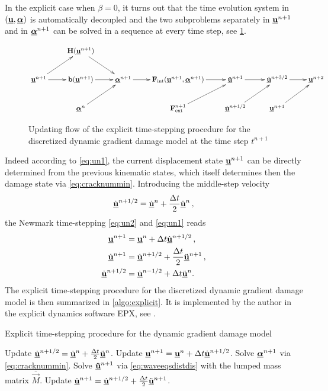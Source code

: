 In the explicit case when $\beta=0$, it turns out that the time evolution system in $(\uvec,\dvec)$ is automatically decoupled and the two subproblems separately in $\uvec^{n+1}$ and in $\dvec^{n+1}$ can be solved in a sequence at every time step, see \cref{fig:updatestate}.
\begin{figure}[htbp]
\centering
\[
\xymatrix{ & \vec{H}(\uvec^{n+1}) \ar[dr] & & & & & \\
\uvec^{n+1} \ar[ur] \ar[r] & \vec{b}(\uvec^{n+1}) \ar[r] & \dvec^{n+1} \ar[r] & \vec{F}_\mathrm{int}(\uvec^{n+1},\dvec^{n+1}) \ar[r] & \ddot{\uvec}^{n+1} \ar[r] & \dot{\uvec}^{n+3/2} \ar[r] & \uvec^{n+2} \\
& \dvec^n \ar[ur] & & \vec{F}_\mathrm{ext}^{n+1} \ar[ur] & \dot{\uvec}^{n+1/2} \ar[ur] & \uvec^{n+1} \ar[ur] &}
\]
\caption{Updating flow of the explicit time-stepping procedure for the discretized dynamic gradient damage model at the time step $t^{n+1}$}
\label{fig:updatestate}
\end{figure}
Indeed according to \eqref{eq:un1}, the current displacement state $\uvec^{n+1}$ can be directly determined from the previous kinematic states, which itself determines then the damage state via \eqref{eq:cracknummin}. Introducing the middle-step velocity
\[
\dot{\uvec}^{n+1/2}=\dot{\uvec}^n+\frac{\Delta t}{2}\ddot{\uvec}^n\,,
\]
the Newmark time-stepping \eqref{eq:un2} and \eqref{eq:un1} reads
\begin{align*}
\uvec^{n+1} &= \uvec^n+\Delta t\dot{\uvec}^{n+1/2}\,, \\
\dot{\uvec}^{n+1} &= \dot{\uvec}^{n+1/2}+\frac{\Delta t}{2}\ddot{\uvec}^{n+1}\,, \\
\dot{\uvec}^{n+1/2} &= \dot{\uvec}^{n-1/2}+\Delta t\ddot{\uvec}^{n}.
\end{align*}
The explicit time-stepping procedure for the discretized dynamic gradient damage model is then summarized in \cref{algo:explicit}. It is implemented by the author in the explicit dynamics software EPX, see \cite{EPX:2015}.
\begin{algorithm}[htbp]
\caption{Explicit time-stepping procedure for the dynamic gradient damage model} \label{algo:explicit}
\begin{algorithmic}[1]\linespread{1.2}\selectfont\normalsize
{}
  \State Update $\dot{\uvec}^{n+1/2}=\dot{\uvec}^{n}+\frac{\Delta t}{2}\ddot{\uvec}^n$.
  \State Update $\uvec^{n+1}=\uvec^n+\Delta t\dot{\uvec}^{n+1/2}$.
  \State Solve $\dvec^{n+1}$ via \eqref{eq:cracknummin}.
  \State Solve $\ddot{\uvec}^{n+1}$ via \eqref{eq:waveeqsdistdis} with the lumped mass matrix $\overline{\vec{M}}$.
  \State Update $\dot{\uvec}^{n+1}=\dot{\uvec}^{n+1/2}+\frac{\Delta t}{2}\ddot{\uvec}^{n+1}$.
\EndFor
\end{algorithmic}
\end{algorithm}

